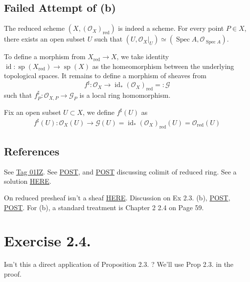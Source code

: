 \subsection{Failed Attempt of (b)}
The reduced scheme $(X,(\mathcal O_X)_{\text{red}})$ is indeed a scheme. For every point $P\in X$, there exists an open subset $U$ such that $(U,\mathcal O_X\vert_U)\simeq (\operatorname{Spec}A,\mathcal O_{\operatorname{Spec}A})$.

To define a morphism from $X_{\text{red}}\to X$, we take identity $\operatorname{id}:\operatorname{sp}(X_{\text{red}})\to\operatorname{sp}(X)$ as the homeomorphism between the underlying topological spaces. It remains to define a morphism of sheaves from 
\[f^{\sharp}:\mathcal O_X\to\operatorname{id}_{\ast}(\mathcal O_X)_{\text{red}}=:\mathcal G\] such that $f^{\sharp}_P:\mathcal O_{X,P}\to \mathcal G_P$ is a local ring homomorphism. 

Fix an open subset $U\subset X$, we define $f^{\sharp}(U)$ as 
\begin{align*}
    f^{\sharp}(U):\mathcal O_X(U)\to\mathcal G(U)=\operatorname{id}_{\ast}(\mathcal O_X)_{\text{red}}(U)=\mathcal O_{\text{red}}(U)
\end{align*}

\subsection{References}
See \href{https://stacks.math.columbia.edu/tag/01IZ}{Tag 01IZ}. See \href{https://math.stackexchange.com/questions/437227/colimit-of-reduced-rings}{POST}, and \href{https://math.stackexchange.com/questions/2737301/reducedness-and-colimit}{POST} discussing colimit of reduced ring. See a solution \href{https://www.math.ncku.edu.tw/~fjmliou/alg/reduced_scheme.pdf}{HERE}.

On reduced presheaf isn't a sheaf \href{https://math.stackexchange.com/questions/338185/the-reduced-presheaf}{HERE}. Discussion on Ex 2.3. (b), \href{https://math.stackexchange.com/questions/682230/exercise-2-3-from-hartshornes-algebraic-geometry}{POST}, \href{https://math.stackexchange.com/questions/441031/reduced-schemes-and-global-sections}{POST}. For (b), a standard treatment is \cite{qing2006algebraic} Chapter 2 2.4 on Page 59.

\section{Exercise 2.4.}

Isn't this a direct application of Proposition 2.3. \cite{hartshorne2013algebraic}? We'll use Prop 2.3. in the proof.

